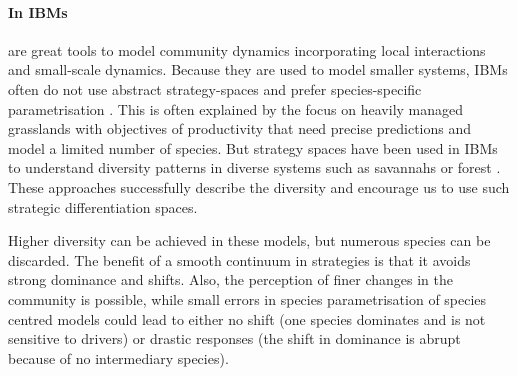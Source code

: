 \paragraph{In IBMs}

 are great tools to model community dynamics incorporating local interactions and small-scale dynamics. Because they are used to model smaller systems, IBMs often do not use abstract strategy-spaces and prefer species-specific parametrisation \parencite{soussana_gemini:_2012, taubert_modelling_2014, lohier_analyse_2016}. This is often explained by the focus on heavily managed grasslands with objectives of productivity that need precise predictions and model a limited number of species. But strategy spaces have been used in IBMs to understand diversity patterns in diverse systems such as savannahs \parencite{reineking_environmental_2006} or forest \parencite{falster_plant:_2016}. These approaches successfully describe the diversity and encourage us to use such strategic differentiation spaces.

Higher diversity can be achieved in these models, but numerous species can be discarded. The benefit of a smooth continuum in strategies is that it avoids strong dominance and shifts. Also, the perception of finer changes in the community is possible, while small errors in species parametrisation of species centred models could lead to either no shift (one species dominates and is not sensitive to drivers) or drastic responses (the shift in dominance is abrupt because of no intermediary species). 




